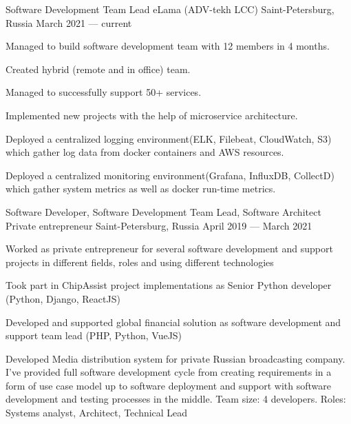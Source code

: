 

\begin{cventries}

  \cventry
    {Software Development Team Lead} %
    {eLama (ADV-tekh LCC)} %
    {Saint-Petersburg, Russia} %
    {March 2021 --- current} %
    {
      \begin{cvitems} %
        \item {Managed to build software development team with 12 members in 4 months.}
        \item {Created hybrid (remote and in office) team.}
        \item {Managed to successfully support 50+ services.}
        \item {Implemented new projects with the help of microservice architecture.}
        \item {Deployed a centralized logging environment(ELK, Filebeat, CloudWatch, S3) which gather log data from docker containers and AWS resources.}
        \item {Deployed a centralized monitoring environment(Grafana, InfluxDB, CollectD) which gather system metrics as well as docker run-time metrics.}
      \end{cvitems}
    }

  \cventry
    {Software Developer, Software Development Team Lead, Software Architect} %
    {Private entrepreneur} %
    {Saint-Petersburg, Russia} %
    {April 2019 --- March 2021} %
    {
      \begin{cvitems} %
        \item {Worked as private entrepreneur for several software development and support projects in different fields, roles and using different technologies}
        \item {Took part in ChipAssist project implementations as Senior Python developer (Python, Django, ReactJS)}
        \item {Developed and supported global financial solution as software development and support team lead (PHP, Python, VueJS)}
        \item {Developed Media distribution system for private Russian broadcasting company. I've provided full software development cycle from creating requirements in a form of use case model up to software deployment and support with software development and testing processes in the middle. Team size: 4 developers. Roles: Systems analyst, Architect, Technical Lead}
      \end{cvitems}
    }


\end{cventries}
